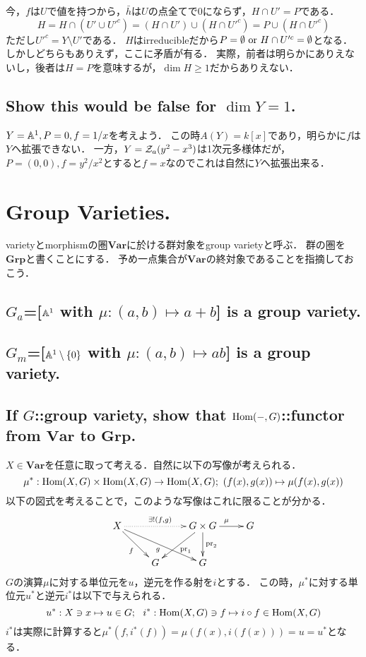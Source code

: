 \documentclass[a4paper]{jarticle}
\begin{document}
    今，$f$は$U$で値を持つから，$\bar{h}$は$U$の点全てで0にならず，$H \cap U'=P$である．
    \[ H=H \cap (U' \cup U'^c)=(H \cap U') \cup (H \cap U'^c)=P \cup (H \cap U'^c) \]
    ただし$U'^c=Y \setminus U'$である．
    $H$はirreducibleだから$P=\emptyset \text{ or } H \cap U'^c=\emptyset$となる．
    しかしどちらもありえず，ここに矛盾が有る．
    実際，前者は明らかにありえないし，後者は$H=P$を意味するが，$\dim H \geq 1$だからありえない．

    \subsection{Show this would be false for $\dim Y = 1$.}
    $Y=\mathbb{A}^1, P=0, f=1/x$を考えよう．
    この時$A(Y)=k[x]$であり，明らかに$f$は$Y$へ拡張できない．
    一方，$Y=\mathcal{Z}_a(y^2-x^3)$は1次元多様体だが，$P=(0,0), f=y^2/x^2$とすると$f=x$なのでこれは自然に$Y$へ拡張出来る．

\section{Group Varieties.}
    varietyとmorphismの圏$\mathbf{Var}$に於ける群対象をgroup varietyと呼ぶ．
    群の圏を$\mathbf{Grp}$と書くことにする．
    予め一点集合が$\mathbf{Var}$の終対象であることを指摘しておこう．

    \subsection{$G_a$=[$\mathbb{A}^1$ with $\mu:(a,b) \mapsto a+b$] is a group variety.}

    \subsection{$G_m$=[$\mathbb{A}^1 \setminus \{0\}$ with $\mu:(a,b) \mapsto ab$] is a group variety.}

    \subsection{If $G$::group variety, show that $\operatorname{Hom}(-,G)$::functor from $\mathbf{Var}$ to $\mathbf{Grp}$.}
    $X \in \mathbf{Var}$を任意に取って考える．自然に以下の写像が考えられる．
    \[ \mu^{\ast}: \operatorname{Hom}(X,G) \times \operatorname{Hom}(X,G) \to \operatorname{Hom}(X,G);~ (f(x),g(x)) \mapsto \mu(f(x),g(x)) \]
    以下の図式を考えることで，このような写像はこれに限ることが分かる．
    \[
    \xymatrix
    {
    X \ar[dr]_{f} \ar[drr]_{g} \ar@{..>}[rr]^{\exists! (f,g)}
        & {}
        & G \times G \ar[dl]^{\pr_1} \ar[d]^{\pr_2} \ar[r]^{\mu}& G \\
    {} & G & G
    }
    \]
    $G$の演算$\mu$に対する単位元を$u$，逆元を作る射を$i$とする．
    この時，$\mu^{\ast}$に対する単位元$u^{\ast}$と逆元$i^{\ast}$は以下で与えられる．
    \[u^{\ast}: X \ni x \mapsto u \in G;~~ i^{\ast}: \operatorname{Hom}(X,G) \ni f \mapsto i \circ f \in \operatorname{Hom}(X,G)\]
    $i^{\ast}$は実際に計算すると$\mu^{\ast}(f, i^{\ast}(f))=\mu(f(x), i(f(x)))=u=u^{\ast}$となる．
\end{document}
